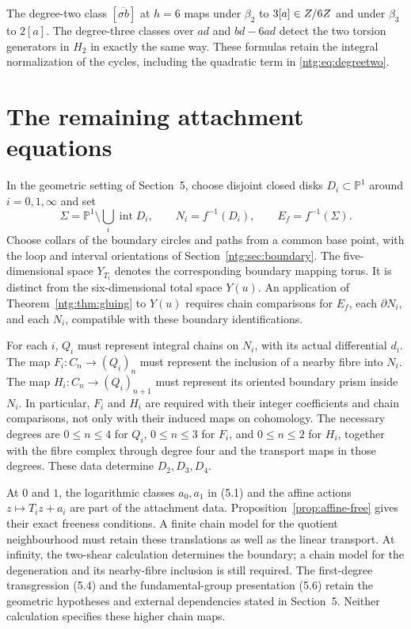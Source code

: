 The degree-two class $[\overline{\sigma b}]$ at
$h=6$ maps under $\beta_2$ to $3[a]\in Z/6Z$ and under
$\beta_3$ to $2[a]$. The degree-three classes over $ad$ and
$bd-6ad$ detect the two torsion generators in $H_2$ in exactly
the same way. These formulas retain the integral normalization of
the cycles, including the quadratic term in \eqref{ntg:eq:degreetwo}.

\section{The remaining attachment equations}\label{ntg:sec:remaining}

In the geometric setting of Section~5, choose disjoint closed disks
$D_i\subset\mathbb P^1$ around $i=0,1,\infty$ and set
\[
 \Sigma=\mathbb P^1\setminus\bigcup_i\operatorname{int}D_i,
 \qquad N_i=f^{-1}(D_i),\qquad E_f=f^{-1}(\Sigma).
\]
Choose collars of the boundary circles and paths from a common base
point, with the loop and interval orientations of
Section~\ref{ntg:sec:boundary}. The five-dimensional space
$Y_{T_i}$ denotes the corresponding boundary mapping torus. It is
distinct from the six-dimensional total space $Y(u)$.
An application of Theorem~\ref{ntg:thm:gluing} to $Y(u)$ requires
chain comparisons for $E_f$, each $\partial N_i$, and each $N_i$,
compatible with these boundary identifications.

For each $i$, $Q_i$ must represent integral chains on $N_i$, with its
actual differential $d_i$. The map $F_i:C_n\to(Q_i)_n$ must represent
the inclusion of a nearby fibre into $N_i$. The map
$H_i:C_n\to(Q_i)_{n+1}$ must represent its oriented boundary prism
inside $N_i$. In particular, $F_i$ and $H_i$ are required with their
integer coefficients and chain comparisons, not only with their induced
maps on cohomology. The necessary degrees are $0\le n\le4$ for
$Q_i$, $0\le n\le3$ for $F_i$, and $0\le n\le2$ for $H_i$,
together with the fibre complex through degree four and the transport
maps in those degrees. These data determine $D_2,D_3,D_4$.

At $0$ and $1$, the logarithmic classes $a_0,a_1$ in (5.1)
and the affine actions $z\mapsto T_iz+a_i$ are part of the attachment
data. Proposition~\ref{prop:affine-free} gives their exact freeness
conditions. A finite chain model for the quotient neighbourhood must
retain these translations as well as the linear transport. At infinity,
the two-shear calculation determines the boundary; a chain model for
the degeneration and its nearby-fibre inclusion is still required.
The first-degree transgression (5.4) and the fundamental-group
presentation (5.6) retain the geometric hypotheses and external
dependencies stated in Section~5. Neither calculation specifies these
higher chain maps.

